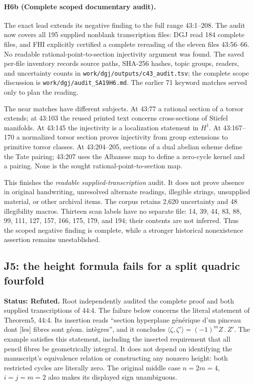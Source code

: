 \paragraph{H6b (Complete scoped documentary audit).}
The exact lead extends its negative finding to the full range
43:1--208. The audit now covers all 195 supplied nonblank
transcription files: DGJ read 184 complete files, and FHI
explicitly certified a complete rereading of the eleven files
43:56--66. No readable rational-point-to-section injectivity
argument was found. The saved per-file inventory records source
paths, SHA-256 hashes, topic groups, readers, and uncertainty
counts in \texttt{work/dgj/outputs/c43\_audit.tsv}; the complete
scope discussion is \texttt{work/dgj/audit\_SA19H6.md}.
The earlier 71 keyword matches served only to plan the reading.

The near matches have different subjects. At 43:77 a rational
section of a torsor extends; at 43:103 the reused printed text
concerns cross-sections of Stiefel manifolds. At 43:145 the
injectivity is a localization statement in $H^1$. At
43:167--170 a normalized torsor section proves injectivity from
group extensions to primitive torsor classes. At 43:204--205,
sections of a dual abelian scheme define the Tate pairing;
43:207 uses the Albanese map to define a zero-cycle kernel and
a pairing. None is the sought rational-point-to-section map.

This finishes the \emph{readable supplied-transcription} audit.
It does not prove absence in original handwriting, unresolved
alternate readings, illegible strings, unsupplied material, or
other archival items. The corpus retains 2,620 uncertainty and
48 illegibility macros. Thirteen scan labels have no separate
file: 14, 39, 44, 83, 88, 99, 111, 127, 157, 166, 175, 179,
and 194; their contents are not inferred. Thus the scoped
negative finding is complete, while a stronger historical
nonexistence assertion remains unestablished.

\subsection*{J5: the height formula fails for a split quadric fourfold}
\textbf{Status: Refuted.} Root independently audited the complete proof and both supplied transcriptions of 44:4.
The failure below concerns the literal statement of Theorem5, 44:4.
Its insertion reads ``section hyperplane générique d'un pinceau dont
[les] fibres sont géom. intègres'', and it concludes
$\langle\zeta,\zeta'\rangle=(-1)^mZ\mathbin{.}Z'$.
The example satisfies this statement,
including the inserted requirement that all pencil fibres be
geometrically integral. It does not depend on identifying the
manuscript's equivalence relation or constructing any nonzero height:
both restricted cycles are literally zero. The original middle
case $n=2m=4$, $i=j=m=2$ also makes its displayed sign unambiguous.


